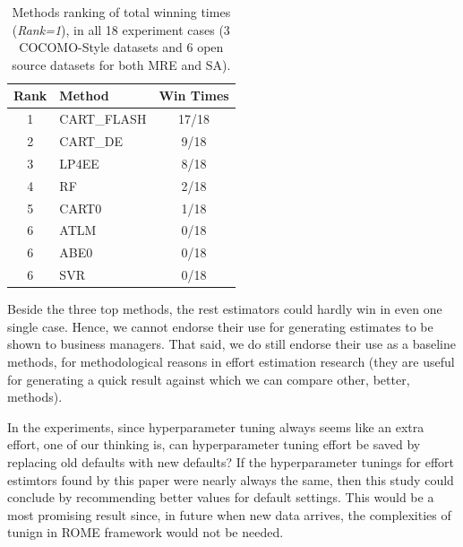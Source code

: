 \begin{table}
\vspace{-15pt}
\small
 \caption{Methods ranking of total winning times ({\em Rank=1}), in all 18 experiment cases (3 COCOMO-Style datasets and 6 open source datasets for both MRE and SA).}\label{tbl:methodsrk}
\centering
{  
\begin{tabular}{clc} \\
  {\textbf{Rank}}& \textbf{Method} & \textbf{Win Times}\\
  \hline
    1 &      CART\_FLASH    &    17/18\\\hline 
    2 &      CART\_DE       &    9/18\\\hline 
    3 &      LP4EE          &    8/18\\\hline 
    4 &      RF             &    2/18\\\hline 
    5 &      CART0          &    1/18\\\hline 
    6 &      ATLM           &    0/18\\
    6 &      ABE0           &    0/18\\
    6 &      SVR            &    0/18\\
    \hline   
\end{tabular}}
\vspace{-10pt}
\end{table}


Beside the three top methods, the rest estimators could hardly win in even one single case. Hence, we cannot endorse their use for generating estimates to be shown to business managers.
That said, we do still endorse their use as a  baseline methods, for methodological reasons in effort estimation research (they are useful for generating a quick result against which we can compare other, better, methods).

In the experiments, since hyperparameter tuning always seems like an extra effort, one of our thinking is, can hyperparameter tuning effort be saved by replacing old defaults with new defaults? If the hyperparameter tunings for effort estimtors found by this paper were nearly always the same, then this study
could conclude by recommending better values for default settings. This would
be a most promising result since, in future when new data arrives, the complexities of tunign in ROME framework would not be needed. 

